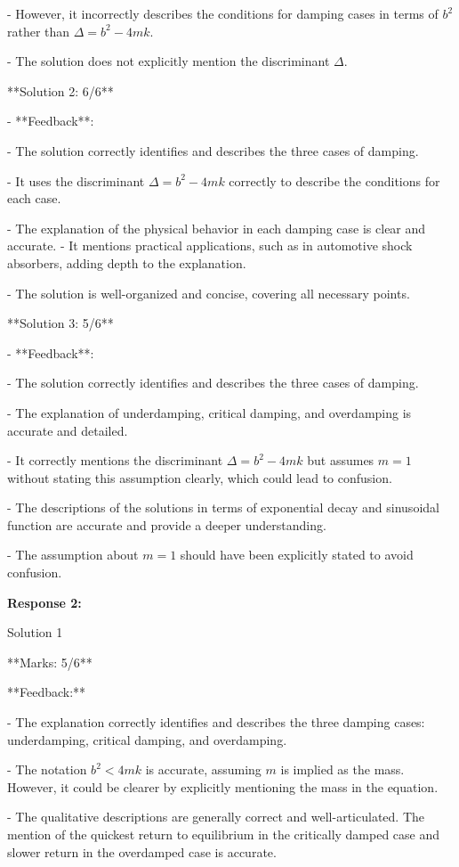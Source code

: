 \documentclass[a4paper,11pt]{article}
\begin{document}
  - However, it incorrectly describes the conditions for damping cases in terms of \(b^2\) rather than \(\Delta = b^2 - 4mk\).
  
  - The solution does not explicitly mention the discriminant \(\Delta\).

**Solution 2: 6/6**

- **Feedback**:

  - The solution correctly identifies and describes the three cases of damping.
  
  - It uses the discriminant \(\Delta = b^2 - 4mk\) correctly to describe the conditions for each case.
  
  - The explanation of the physical behavior in each damping case is clear and accurate.
  - It mentions practical applications, such as in automotive shock absorbers, adding depth to the explanation.
  
  - The solution is well-organized and concise, covering all necessary points.

**Solution 3: 5/6**

- **Feedback**:

  - The solution correctly identifies and describes the three cases of damping.
  
  - The explanation of underdamping, critical damping, and overdamping is accurate and detailed.
  
  - It correctly mentions the discriminant \(\Delta = b^2 - 4mk\) but assumes \(m = 1\) without stating this assumption clearly, which could lead to confusion.
  
  - The descriptions of the solutions in terms of exponential decay and sinusoidal function are accurate and provide a deeper understanding.
  
  - The assumption about \(m = 1\) should have been explicitly stated to avoid confusion.

\bigskip
\textbf{Response 2:}

Solution 1

**Marks: 5/6**

**Feedback:**

- The explanation correctly identifies and describes the three damping cases: underdamping, critical damping, and overdamping.

- The notation \(b^2 < 4mk\) is accurate, assuming \(m\) is implied as the mass. However, it could be clearer by explicitly mentioning the mass in the equation.

- The qualitative descriptions are generally correct and well-articulated. The mention of the quickest return to equilibrium in the critically damped case and slower return in the overdamped case is accurate.
\end{document}
